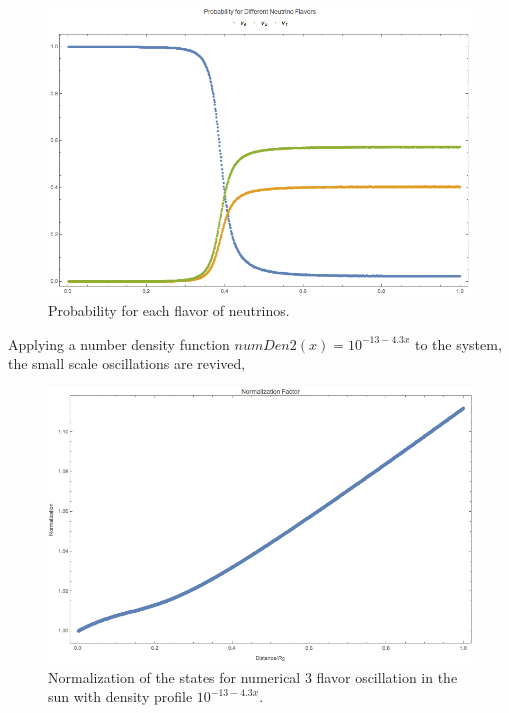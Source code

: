 \documentclass{tufte-handout}
\begin{document}
\begin{figure}
\centering
\includegraphics{assets/numericalMSW3Flavor-probabilities.png}
\caption{Probability for each flavor of neutrinos.}
\label{fig:numericalMSW3Flavor-probabilities}
\end{figure}



Applying a number density function $numDen2(x) = 10^{-13 - 4.3 x}$ to the system, the small scale oscillations are revived,

\begin{figure}
\centering
\includegraphics{assets/numericalMSW3Flavor-2-norm}
\caption{Normalization of the states for numerical 3 flavor oscillation in the sun with density profile $10^{-13 - 4.3 x}$.}
\label{fig:numericalMSW3Flavor-2-norm}
\end{figure}
\end{document}
